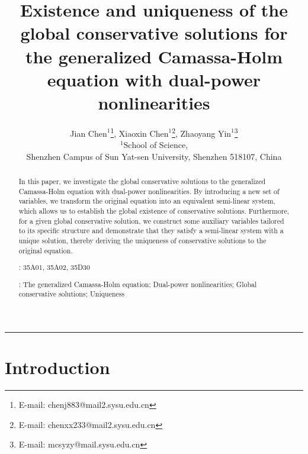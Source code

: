 \documentclass[10pt]{article}
\numberwithin{equation}{section}
\begin{document}
	\title{Existence and uniqueness of the global conservative solutions for the generalized Camassa-Holm equation with dual-power nonlinearities
		\hspace{-4mm}
	}
	
	\author{Jian $\mbox{Chen}^1$\footnote{E-mail: chenj883@mail2.sysu.edu.cn},\quad
		Xiaoxin $\mbox{Chen}^1$\footnote{E-mail: chenxx233@mail2.sysu.edu.cn},\quad
		Zhaoyang $\mbox{Yin}^{1}$\footnote{E-mail: mcsyzy@mail.sysu.edu.cn}\\
		$^1\mbox{School}$ of Science,\\ Shenzhen Campus of Sun Yat-sen University, Shenzhen 518107, China}
	\date{}
	\maketitle
	\hrule
	
	\begin{abstract}
		In this paper, we investigate the global conservative solutions to the generalized Camassa-Holm equation with dual-power nonlinearities. By introducing a new set of variables, we transform the original equation into an equivalent semi-linear system, which allows us to establish the global existence of conservative solutions. Furthermore, for a given global conservative solution, we construct some auxiliary variables tailored to its specific structure and demonstrate that they satisfy a semi-linear system with a unique solution, thereby deriving the uniqueness of conservative solutions to the original equation.
		
		\vspace*{5pt}
		: 35A01, 35A02, 35D30
		
		\vspace*{5pt}
		: The generalized Camassa-Holm equation; Dual-power nonlinearities; Global conservative solutions; Uniqueness 
	\end{abstract}
	
	
	\tableofcontents
	
	\section{Introduction}
	
\end{document}

